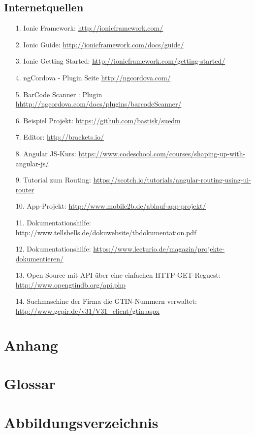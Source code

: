 \documentclass[12pt,a4paper]{article}
\begin{document}
\subsection*{Internetquellen}
\begin{itemize}
\item[1.]Ionic Framework: \url{http://ionicframework.com/}
\item[2.]Ionic Guide: \url{http://ionicframework.com/docs/guide/}
\item[3.]Ionic Getting Started: \url{http://ionicframework.com/getting-started/}
\item[4.]ngCordova - Plugin Seite \url{http://ngcordova.com/}
\item[5.]BarCode Scanner : Plugin \url{hhttp://ngcordova.com/docs/plugins/barcodeScanner/}
\item[6.]Beispiel Projekt: \url{https://github.com/bastisk/suedm}
\item[7.]Editor: \url{http://brackets.io/}
\item[8.]Angular JS-Kurs: \url{https://www.codeschool.com/courses/shaping-up-with-angular-js/}
\item[9.]Tutorial zum Routing: \url{https://scotch.io/tutorials/angular-routing-using-ui-router}
\item[10.]App-Projekt: \url{http://www.mobile2b.de/ablauf-app-projekt/}
\item[11.] Dokumentationshilfe: \url{http://www.tellsbells.de/dokuwebsite/tbdokumentation.pdf}
\item[12.] Dokumentationshilfe: \url{https://www.lecturio.de/magazin/projekte-dokumentieren/}
\item[13.] Open Source mit API über eine einfachen HTTP-GET-Reguest: \url{http://www.opengtindb.org/api.php}
\item[14.] Suchmaschine der Firma die GTIN-Nummern verwaltet: \url{http://www.gepir.de/v31/V31_client/gtin.aspx}
\end{itemize}
\newpage
\section*{Anhang}
\newpage
\section*{Glossar}
\newpage
\section*{Abbildungsverzeichnis}
\newpage
\end{document}
